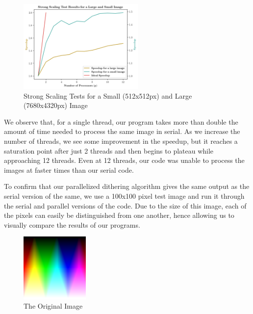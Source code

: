 \documentclass{article}
\begin{document}
\begin{figure}[H]
    \centering
    \includegraphics[width=0.55\textwidth]{graphs/strong_scaling_test_plots.png}
    \caption{Strong Scaling Tests for a Small (512x512px) and Large (7680x4320px) Image}
    \label{fig:scaling_tests}
\end{figure}

\noindent We observe that, for a single thread, our program takes more than double the amount of time needed to process the same image in serial. As we increase the number of threads, we see some improvement in the speedup, but it reaches a saturation point after just 2 threads and then begins to plateau while approaching 12 threads. Even at 12 threads, our code was unable to process the images at faster times than our serial code.

\medskip
\noindent To confirm that our parallelized dithering algorithm gives the same output as the serial version of the same, we use a 100x100 pixel test image and run it through the serial and parallel versions of the code. Due to the size of this image, each of the pixels can easily be distinguished from one another, hence allowing us to visually compare the results of our programs.

\begin{figure}[H]
    \centering
    \includegraphics[width=0.30\textwidth]{images/RGB_color_gradient_100x100.png}
    \caption{The Original Image}
    \label{fig:confirmation_image}
\end{figure}
\end{document}
